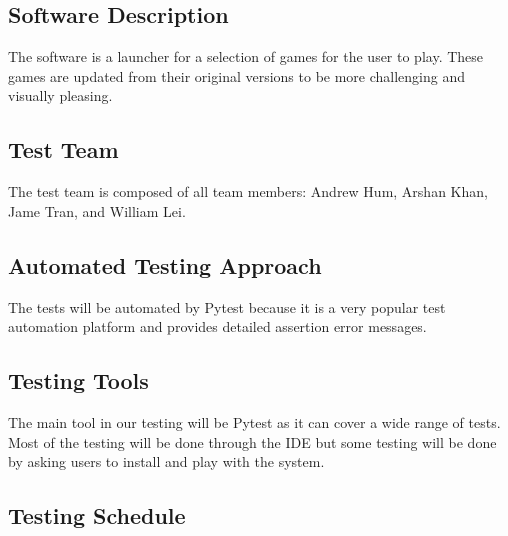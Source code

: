 \documentclass[12pt, titlepage]{article}
\begin{document}
\subsection{Software Description}

The software is a launcher for a selection of games for the user to play. These games are updated from their original versions to be more challenging and visually pleasing.

\subsection{Test Team}

The test team is composed of all team members: Andrew Hum, Arshan Khan, Jame Tran, and William Lei.

\subsection{Automated Testing Approach}

The tests will be automated by Pytest because it is a very popular test automation platform and provides detailed assertion error messages.

\subsection{Testing Tools}
The main tool in our testing will be Pytest as it can cover a wide range of tests. Most of the testing will be done through the IDE but some testing will be done by asking users to install and play with the system.

\subsection{Testing Schedule}
		
\end{document}
